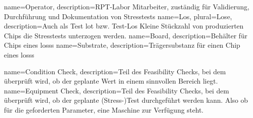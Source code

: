 {
    name=Operator,
    description={RPT-Labor Mitarbeiter, zuständig für Validierung, Durchführung und Dokumentation von Stresstests}
}
{
    name=Los,
    plural=Lose,
    description={Auch als Test lot bzw. Test-Los Kleine Stückzahl von produzierten Chips die Stresstests unterzogen werden.}
}
{
    name=Board,
    description={Behälter für Chips eines \glspl{los}s}
}
{
    name=Substrate,
    description={Trägersubstanz für einen Chip eines \glspl{los}s}
}

{
    name=Condition Check,
    description={Teil des Feasibility Checks, bei dem überprüft wird, ob der geplante Wert in einem sinnvollen Bereich liegt.}
}
{
    name=Equipment Check,
    description={Teil des Feasibility Checks, bei dem überprüft wird, ob der geplante (Stress-)Test durchgeführt werden kann. Also ob für die geforderten Parameter, eine Maschine zur Verfügung steht.}
}



